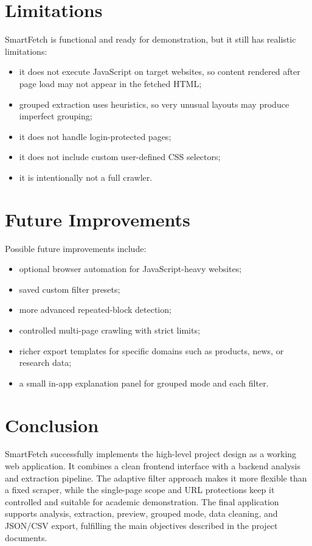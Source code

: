 \documentclass[11pt,a4paper]{article}
\begin{document}
\section{Limitations}

SmartFetch is functional and ready for demonstration, but it still has realistic limitations:

\begin{itemize}
  \item it does not execute JavaScript on target websites, so content rendered after page load may not appear in the fetched HTML;
  \item grouped extraction uses heuristics, so very unusual layouts may produce imperfect grouping;
  \item it does not handle login-protected pages;
  \item it does not include custom user-defined CSS selectors;
  \item it is intentionally not a full crawler.
\end{itemize}

\section{Future Improvements}

Possible future improvements include:

\begin{itemize}
  \item optional browser automation for JavaScript-heavy websites;
  \item saved custom filter presets;
  \item more advanced repeated-block detection;
  \item controlled multi-page crawling with strict limits;
  \item richer export templates for specific domains such as products, news, or research data;
  \item a small in-app explanation panel for grouped mode and each filter.
\end{itemize}

\section{Conclusion}

SmartFetch successfully implements the high-level project design as a working web application. It combines a clean frontend interface with a backend analysis and extraction pipeline. The adaptive filter approach makes it more flexible than a fixed scraper, while the single-page scope and URL protections keep it controlled and suitable for academic demonstration. The final application supports analysis, extraction, preview, grouped mode, data cleaning, and JSON/CSV export, fulfilling the main objectives described in the project documents.
\end{document}
